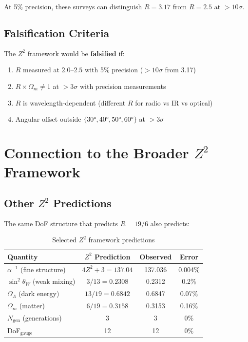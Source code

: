 \documentclass[12pt,a4paper]{article}
\begin{document}
At 5\% precision, these surveys can distinguish $R = 3.17$ from $R = 2.5$ at $>10\sigma$.

\subsection{Falsification Criteria}

The $Z^2$ framework would be \textbf{falsified} if:

\begin{enumerate}
    \item $R$ measured at $2.0$--$2.5$ with 5\% precision ($>10\sigma$ from 3.17)
    \item $R \times \Omega_m \neq 1$ at $>3\sigma$ with precision measurements
    \item $R$ is wavelength-dependent (different $R$ for radio vs IR vs optical)
    \item Angular offset outside $\{30°, 40°, 50°, 60°\}$ at $>3\sigma$
\end{enumerate}

\section{Connection to the Broader $Z^2$ Framework}

\subsection{Other $Z^2$ Predictions}

The same DoF structure that predicts $R = 19/6$ also predicts:

\begin{table}[H]
\centering
\caption{Selected $Z^2$ framework predictions}
\begin{tabular}{lccc}
\toprule
Quantity & $Z^2$ Prediction & Observed & Error \\
\midrule
$\alpha^{-1}$ (fine structure) & $4Z^2 + 3 = 137.04$ & 137.036 & 0.004\% \\
$\sin^2\theta_W$ (weak mixing) & $3/13 = 0.2308$ & 0.2312 & 0.2\% \\
$\Omega_\Lambda$ (dark energy) & $13/19 = 0.6842$ & 0.6847 & 0.07\% \\
$\Omega_m$ (matter) & $6/19 = 0.3158$ & 0.3153 & 0.16\% \\
$N_{\text{gen}}$ (generations) & 3 & 3 & 0\% \\
DoF$_{\text{gauge}}$ & 12 & 12 & 0\% \\
\bottomrule
\end{tabular}
\end{table}
\end{document}

